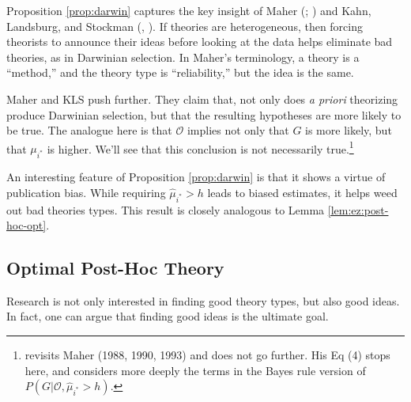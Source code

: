 \documentclass[12pt,english]{article}
\theoremstyle{plain}
\theoremstyle{plain}
\begin{document}
Proposition \ref{prop:darwin} captures the key insight of Maher (\citeyear{maher1988prediction}; \citeyear{maher1990prediction}) and Kahn, Landsburg, and Stockman (\citeyear{kahn1992novel}, \citeyear{kahn1996positive}). If theories are heterogeneous, then forcing theorists to announce their ideas before looking at the data helps eliminate bad theories, as in Darwinian selection.  In Maher's terminology, a theory  is a ``method,'' and the theory type is ``reliability,'' but the idea is the same. 


Maher and KLS push further. They claim that, not only does \emph{a priori} theorizing produce Darwinian selection, but that the resulting hypotheses are more likely to be true. The analogue here is that $\mathcal{O}$ implies not only that $G$ is more likely, but that $\mu_{i^\ast}$ is higher. We'll see that this conclusion is not necessarily true.\footnote{\citet{barnes1996discussion} revisits Maher (1988, 1990, 1993) and does not go further. His Eq (4) stops here, and considers more deeply the terms in the Bayes rule version of $P\left(G|\mathcal{O},\hat{\mu}_{i^{\ast}}>h\right)$. 
} 

An interesting feature of Proposition \ref{prop:darwin} is that it shows a virtue of publication bias. While requiring $\hat{\mu}_{i^{\ast}}>h$ leads to biased estimates, it helps weed out bad theories types. This result is closely analogous to Lemma \ref{lem:ez:post-hoc-opt}. 




\subsection{Optimal Post-Hoc Theory}

Research is not only interested in finding good theory types, but also good ideas. In fact, one can argue that finding good ideas is the ultimate goal. 
\end{document}
